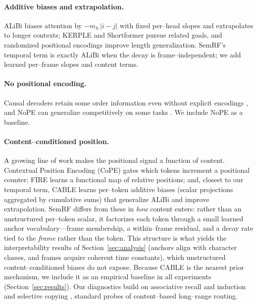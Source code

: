 \documentclass[11pt]{article}
\begin{document}
\paragraph{Additive biases and extrapolation.} ALiBi \citep{press2022train}
biases attention by $-m_h\,|i-j|$ with fixed per--head slopes and extrapolates to
longer contexts; KERPLE \citep{chi2022kerple} and Shortformer
\citep{press2021shortformer} pursue related goals, and randomized positional
encodings \citep{ruoss2023randomized} improve length generalization. SemRF's
temporal term is exactly ALiBi when the decay is frame--independent; we add
learned per--frame slopes and content terms.

\paragraph{No positional encoding.} Causal decoders retain some order
information even without explicit encodings \citep{haviv2022transformer}, and
NoPE can generalize competitively on some tasks \citep{kazemnejad2023impact}. We
include NoPE as a baseline.

\paragraph{Content--conditioned position.} A growing line of work makes the
positional signal a function of content. Contextual Position Encoding (CoPE)
\citep{golovneva2024contextual} gates which tokens increment a positional
counter; FIRE \citep{li2023functional} learns a functional map of relative
positions; and, closest to our temporal term, CABLE \citep{veisi2025cable}
learns per--token additive biases (scalar projections aggregated by cumulative
sums) that generalize ALiBi and improve extrapolation. SemRF differs from these
in \emph{how} content enters: rather than an unstructured per--token scalar, it
factorizes each token through a small learned anchor vocabulary---frame
membership, a within--frame residual, and a decay rate tied to the \emph{frame}
rather than the token. This structure is what yields the interpretability
results of Section~\ref{sec:analysis} (anchors align with character classes,
and frames acquire coherent time constants), which unstructured
content--conditioned biases do not expose. Because CABLE is the nearest prior
mechanism, we include it as an empirical baseline in all experiments
(Section~\ref{sec:results}). Our diagnostics build on associative
recall and induction \citep{olsson2022context,arora2023zoology} and selective
copying \citep{gu2023mamba}, standard probes of content--based long--range
routing.
\end{document}
